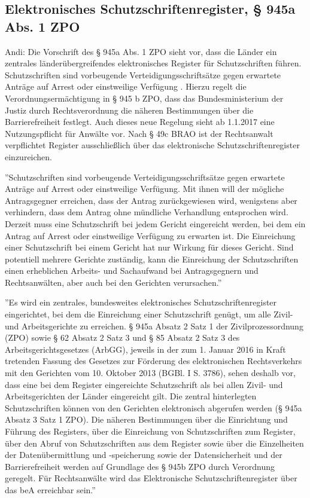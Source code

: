 \subsection*{Elektronisches Schutzschriftenregister, § 945a Abs. 1 ZPO}
Andi:
Die Vorschrift des § 945a Abs. 1 ZPO sieht vor, dass die Länder ein zentrales länderübergreifendes elektronisches Register für Schutzschriften führen. Schutzschriften sind vorbeugende Verteidigungsschriftsätze gegen erwartete Anträge auf Arrest oder einstweilige Verfügung . Hierzu regelt die Verordnungsermächtigung in § 945 b ZPO, dass das Bundesministerium der Justiz durch Rechtsverordnung die näheren Bestimmungen über die Barrierefreiheit festlegt.
Auch dieses neue Regelung sieht ab 1.1.2017 eine Nutzungspflicht für Anwälte vor. Nach § 49c BRAO ist der Rechtsanwalt verpflichtet Register ausschließlich über das elektronische Schutzschriftenregister einzureichen.

''Schutzschriften sind vorbeugende Verteidigungsschriftsätze gegen erwartete Anträge auf Arrest oder einstweilige Verfügung. Mit ihnen will der mögliche Antragsgegner erreichen, dass der Antrag zurückgewiesen wird, wenigstens aber verhindern, dass dem Antrag ohne mündliche Verhandlung entsprochen wird. Derzeit muss eine Schutzschrift bei jedem Gericht eingereicht werden, bei dem ein Antrag auf Arrest oder einstweilige Verfügung zu erwarten ist. Die Einreichung einer Schutzschrift bei einem Gericht hat nur Wirkung für dieses Gericht. Sind potentiell mehrere Gerichte zuständig, kann die Einreichung der Schutzschriften einen erheblichen Arbeits- und Sachaufwand bei Antragsgegnern und Rechtsanwälten, aber auch bei den Gerichten verursachen.'' \cite{bea:bea:brak-schutzschriften}

''Es wird ein zentrales, bundesweites elektronisches Schutzschriftenregister eingerichtet, bei dem die Einreichung einer Schutzschrift genügt, um alle Zivil- und Arbeitsgerichte zu erreichen. § 945a Absatz 2 Satz 1 der Zivilprozessordnung (ZPO) sowie § 62 Absatz 2 Satz 3 und § 85 Absatz 2 Satz 3 des Arbeitsgerichtsgesetzes (ArbGG), jeweils in der zum 1. Januar 2016 in Kraft tretenden Fassung des Gesetzes zur Förderung des elektronischen Rechtsverkehrs mit den Gerichten vom 10. Oktober 2013 (BGBl. I S. 3786), sehen deshalb vor, dass eine bei dem Register eingereichte Schutzschrift als bei allen Zivil- und Arbeitsgerichten der Länder eingereicht gilt. Die zentral hinterlegten Schutzschriften können von den Gerichten elektronisch abgerufen werden (§ 945a Absatz 3 Satz 1 ZPO). Die näheren Bestimmungen über die Einrichtung und Führung des Registers, über die Einreichung von Schutzschriften zum Register, über den Abruf von Schutzschriften aus dem Register sowie über die Einzelheiten der Datenübermittlung und -speicherung sowie der Datensicherheit und der Barrierefreiheit werden auf Grundlage des § 945b ZPO durch Verordnung geregelt. Für Rechtsanwälte wird das Elektronische Schutzschriftenregister über das beA erreichbar sein.'' \cite{bea:bea:brak-schutzschriften}
